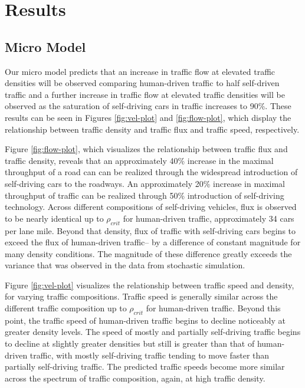 \section{Results} \label{sec:results}

\subsection{Micro Model}

Our micro model predicts that an increase in traffic flow at elevated traffic densities will be observed comparing human-driven traffic to half self-driven traffic and a further increase in traffic flow at elevated traffic densities will be observed as the saturation of self-driving cars in traffic increases to 90\%. These results can be seen in Figures \ref{fig:vel-plot} and \ref{fig:flow-plot}, which display the relationship between traffic density and traffic flux and traffic speed, respectively. 



Figure \ref{fig:flow-plot}, which visualizes the relationship between traffic flux and traffic density, reveals that an approximately 40\% increase in the maximal throughput of a road can can be realized through the widespread introduction of self-driving cars to the roadways. An approximately 20\% increase in maximal throughput of traffic can be realized through 50\% introduction of self-driving technology. Across different compositions of self-driving vehicles, flux is observed to be nearly identical up to $\rho_{crit}$ for human-driven traffic, approximately 34 cars per lane mile. Beyond that density, flux of traffic with self-driving cars begins to exceed the flux of human-driven traffic-- by a difference of constant magnitude for many density conditions. The magnitude of these difference greatly exceeds the variance that was observed in the data from stochastic simulation.

Figure \ref{fig:vel-plot} visualizes the relationship between traffic speed and density, for varying traffic compositions. Traffic speed is generally similar across the different traffic composition up to $\rho_{crit}$ for human-driven traffic. Beyond this point, the traffic speed of human-driven traffic begins to decline noticeably at greater density levels. The speed of mostly and partially self-driving traffic begins to decline at slightly greater densities but still is greater than that of human-driven traffic, with mostly self-driving traffic tending to move faster than partially self-driving traffic. The predicted traffic speeds become more similar across the spectrum of traffic composition, again, at high traffic density.

